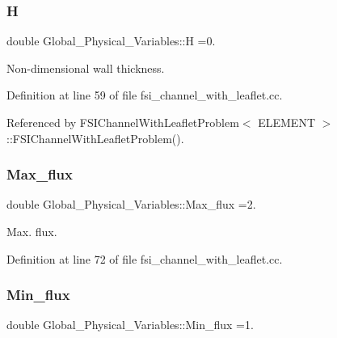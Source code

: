 \subsubsection{\texorpdfstring{H}{H}}
{\footnotesize\ttfamily double Global\+\_\+\+Physical\+\_\+\+Variables\+::H =0.}



Non-\/dimensional wall thickness. 



Definition at line 59 of file fsi\+\_\+channel\+\_\+with\+\_\+leaflet.\+cc.



Referenced by F\+S\+I\+Channel\+With\+Leaflet\+Problem$<$ E\+L\+E\+M\+E\+N\+T $>$\+::\+F\+S\+I\+Channel\+With\+Leaflet\+Problem().

\mbox{\label{namespaceGlobal__Physical__Variables_aee645139728fd3d01573b161c74e7e8a}} 
\subsubsection{\texorpdfstring{Max\+\_\+flux}{Max\_flux}}
{\footnotesize\ttfamily double Global\+\_\+\+Physical\+\_\+\+Variables\+::\+Max\+\_\+flux =2.}



Max. flux. 



Definition at line 72 of file fsi\+\_\+channel\+\_\+with\+\_\+leaflet.\+cc.

\mbox{\label{namespaceGlobal__Physical__Variables_aa46dc81a0757e8f9707646e03c32d4fc}} 
\subsubsection{\texorpdfstring{Min\+\_\+flux}{Min\_flux}}
{\footnotesize\ttfamily double Global\+\_\+\+Physical\+\_\+\+Variables\+::\+Min\+\_\+flux =1.}



